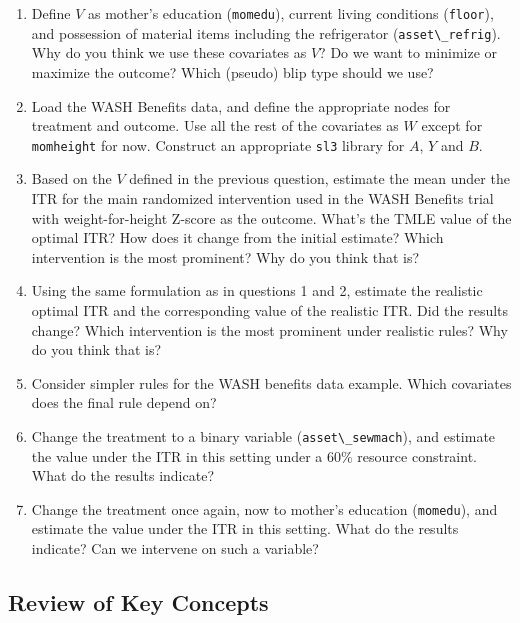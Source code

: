 \documentclass[
  12pt, krantz2,
]{krantz}
\newcommand{\passthrough}[1]{#1}
\theoremstyle{definition}
\theoremstyle{definition}
\theoremstyle{definition}
\newcommand{\1}{\mathbbm{1}}
\begin{document}
\begin{enumerate}
\def\labelenumi{\arabic{enumi}.}
\item
  Define \(V\) as mother's education (\passthrough{\lstinline!momedu!}), current living conditions (\passthrough{\lstinline!floor!}),
  and possession of material items including the refrigerator (\passthrough{\lstinline!asset\_refrig!}).
  Why do you think we use these covariates as \(V\)? Do we want to minimize or
  maximize the outcome? Which (pseudo) blip type should we use?
\item
  Load the WASH Benefits data, and define the appropriate nodes for treatment
  and outcome. Use all the rest of the covariates as \(W\) except for
  \passthrough{\lstinline!momheight!} for now. Construct an appropriate \passthrough{\lstinline!sl3!} library for \(A\), \(Y\) and
  \(B\).
\item
  Based on the \(V\) defined in the previous question, estimate the mean under
  the ITR for the main randomized intervention used in the WASH Benefits trial
  with weight-for-height Z-score as the outcome. What's the TMLE value of the
  optimal ITR? How does it change from the initial estimate? Which
  intervention is the most prominent? Why do you think that is?
\item
  Using the same formulation as in questions 1 and 2, estimate the realistic
  optimal ITR and the corresponding value of the realistic ITR. Did the results
  change? Which intervention is the most prominent under realistic rules? Why do
  you think that is?
\item
  Consider simpler rules for the WASH benefits data example. Which covariates does the
  final rule depend on?
\item
  Change the treatment to a binary variable (\passthrough{\lstinline!asset\_sewmach!}), and estimate the
  value under the ITR in this setting under a \(60\%\) resource constraint. What
  do the results indicate?
\item
  Change the treatment once again, now to mother's education (\passthrough{\lstinline!momedu!}), and
  estimate the value under the ITR in this setting. What do the results
  indicate? Can we intervene on such a variable?
\end{enumerate}

\hypertarget{review-of-key-concepts-1}{%
\subsection{Review of Key Concepts}\label{review-of-key-concepts-1}}
\end{document}
